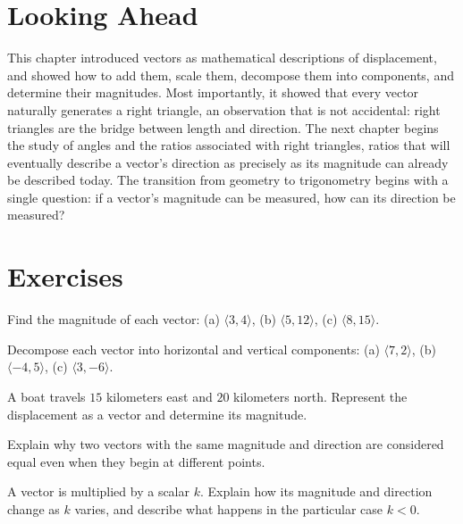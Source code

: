 \section{Looking Ahead}

This chapter introduced vectors as mathematical descriptions of
displacement, and showed how to add them, scale them, decompose them into
components, and determine their magnitudes. Most importantly, it showed that
every vector naturally generates a right triangle, an observation that is
not accidental: right triangles are the bridge between length and
direction. The next chapter begins the study of angles and the ratios
associated with right triangles, ratios that will eventually describe a
vector's direction as precisely as its magnitude can already be described
today. The transition from geometry to trigonometry begins with a single
question: if a vector's magnitude can be measured, how can its direction be
measured?

\section{Exercises}
\begin{exercise}
Find the magnitude of each vector: (a) $\langle 3,4 \rangle$, (b)
$\langle 5,12 \rangle$, (c) $\langle 8,15 \rangle$.
\end{exercise}

\begin{exercise}
Decompose each vector into horizontal and vertical components: (a)
$\langle 7,2 \rangle$, (b) $\langle -4,5 \rangle$, (c) $\langle 3,-6
\rangle$.
\end{exercise}

\begin{exercise}
A boat travels $15$ kilometers east and $20$ kilometers north. Represent the
displacement as a vector and determine its magnitude.
\end{exercise}

\begin{exercise}
Explain why two vectors with the same magnitude and direction are considered
equal even when they begin at different points.
\end{exercise}

\begin{exercise}
A vector is multiplied by a scalar $k$. Explain how its magnitude and
direction change as $k$ varies, and describe what happens in the particular
case $k < 0$.
\end{exercise}
